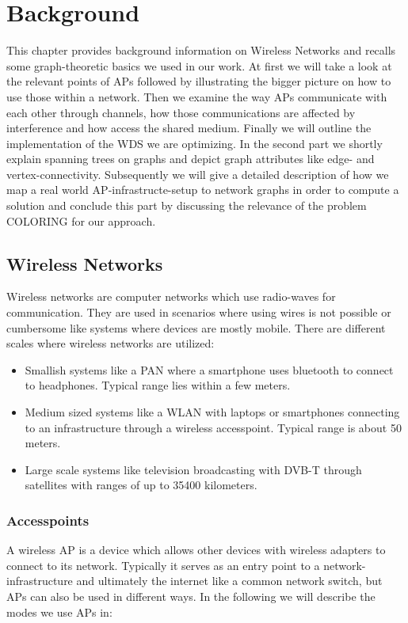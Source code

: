 \chapter{Background}
This chapter provides background information on Wireless Networks and recalls some graph-theoretic basics we used in our work.
At first we will take a look at the relevant points of APs followed by illustrating the bigger picture on how to use those
within a network. Then we examine the way APs communicate with each other through channels, how those communications are affected by interference and
how access the shared medium. Finally we will outline the implementation of the \ac{WDS} we are optimizing.
In the second part we shortly explain spanning trees on graphs and depict graph attributes like edge- and vertex-connectivity.
Subsequently we will give a detailed description of how we map a real world \ac{AP}-infrastructe-setup to network graphs in order 
to compute a solution and conclude this part by discussing the relevance of the problem COLORING for our approach.

\section{Wireless Networks}
  Wireless networks are computer networks which use radio-waves for communication.
  They are used in scenarios where using wires is not possible or cumbersome like systems where devices are mostly mobile.
  There are different scales where wireless networks are utilized:
  \begin{itemize}
    \item Smallish systems like a \ac{PAN} where a smartphone uses bluetooth to connect to headphones. Typical range lies within a few meters.
    \item Medium sized systems like a \ac{WLAN} with laptops or smartphones connecting to an infrastructure through a wireless accesspoint.
      Typical range is about 50 meters.
    \item Large scale systems like television broadcasting with \ac{DVB-T} through satellites with ranges of up to 35400 kilometers.
  \end{itemize}

  \subsection{Accesspoints}
    A wireless \ac{AP} is a device which allows other devices with wireless adapters to connect to its network.
    Typically it serves as an entry point to a network-infrastructure and ultimately the internet like a common network switch, 
    but APs can also be used in different ways. In the following we will describe the modes we use APs in:
    
